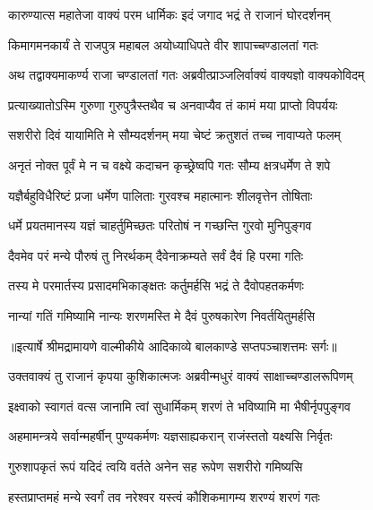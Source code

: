 \twolineshloka
{कारुण्यात्स महातेजा वाक्यं परम धार्मिकः}
{इदं जगाद भद्रं ते राजानं घोरदर्शनम्} %

\twolineshloka
{किमागमनकार्यं ते राजपुत्र महाबल}
{अयोध्याधिपते वीर शापाच्चण्डालतां गतः} %

\twolineshloka
{अथ तद्वाक्यमाकर्ण्य राजा चण्डालतां गतः}
{अब्रवीत्प्राञ्जलिर्वाक्यं वाक्यज्ञो वाक्यकोविदम्} %

\twolineshloka
{प्रत्याख्यातोऽस्मि गुरुणा गुरुपुत्रैस्तथैव च}
{अनवाप्यैव तं कामं मया प्राप्तो विपर्ययः} %

\twolineshloka
{सशरीरो दिवं यायामिति मे सौम्यदर्शनम्}
{मया चेष्टं क्रतुशतं तच्च नावाप्यते फलम्} %

\twolineshloka
{अनृतं नोक्त पूर्वं मे न च वक्ष्ये कदाचन}
{कृच्छ्रेष्वपि गतः सौम्य क्षत्रधर्मेण ते शपे} %

\twolineshloka
{यज्ञैर्बहुविधैरिष्टं प्रजा धर्मेण पालिताः}
{गुरवश्च महात्मानः शीलवृत्तेन तोषिताः} %

\twolineshloka
{धर्मे प्रयतमानस्य यज्ञं चाहर्तुमिच्छतः}
{परितोषं न गच्छन्ति गुरवो मुनिपुङ्गव} %

\twolineshloka
{दैवमेव परं मन्ये पौरुषं तु निरर्थकम्}
{दैवेनाक्रम्यते सर्वं दैवं हि परमा गतिः} %

\twolineshloka
{तस्य मे परमार्तस्य प्रसादमभिकाङ्क्षतः}
{कर्तुमर्हसि भद्रं ते दैवोपहतकर्मणः} %

\twolineshloka
{नान्यां गतिं गमिष्यामि नान्यः शरणमस्ति मे}
{दैवं पुरुषकारेण निवर्तयितुमर्हसि} %


{॥इत्यार्षे श्रीमद्रामायणे वाल्मीकीये आदिकाव्ये बालकाण्डे सप्तपञ्चाशत्तमः सर्गः॥}


\twolineshloka
{उक्तवाक्यं तु राजानं कृपया कुशिकात्मजः}
{अब्रवीन्मधुरं वाक्यं साक्षाच्चण्डालरूपिणम्} %

\twolineshloka
{इक्ष्वाको स्वागतं वत्स जानामि त्वां सुधार्मिकम्}
{शरणं ते भविष्यामि मा भैषीर्नृपपुङ्गव} %

\twolineshloka
{अहमामन्त्रये सर्वान्महर्षीन् पुण्यकर्मणः}
{यज्ञसाह्यकरान् राजंस्ततो यक्ष्यसि निर्वृतः} %

\twolineshloka
{गुरुशापकृतं रूपं यदिदं त्वयि वर्तते}
{अनेन सह रूपेण सशरीरो गमिष्यसि} %

\twolineshloka
{हस्तप्राप्तमहं मन्ये स्वर्गं तव नरेश्वर}
{यस्त्वं कौशिकमागम्य शरण्यं शरणं गतः} %


